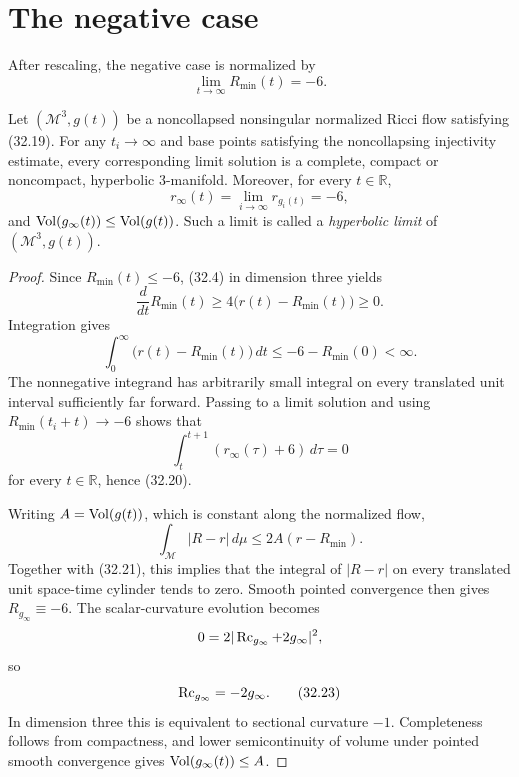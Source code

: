 \section{The negative case}

After rescaling, the negative case is normalized by
\begin{equation*}
 \lim_{t\to\infty}R_{\min}(t)=-6.
 \tag{32.19}
\end{equation*}

\begin{proposition}
\label{prop:chow-iv-negative-case-hyperbolic-limit}
Let $(\mathcal M^3,g(t))$ be a noncollapsed nonsingular normalized Ricci
flow satisfying (32.19).  For any $t_i\to\infty$ and base points satisfying
the noncollapsing injectivity estimate, every corresponding limit solution
is a complete, compact or noncompact, hyperbolic $3$-manifold.  Moreover,
for every $t\in\mathbb R$,
\begin{equation*}
 r_\infty(t)=\lim_{i\to\infty}r_{g_i(t)}=-6,
 \tag{32.20}
\end{equation*}
and $\operatorname{Vol}(g_\infty(t))\le\operatorname{Vol}(g(t))$.  Such a limit is called a
\emph{hyperbolic limit} of $(\mathcal M^3,g(t))$.
\end{proposition}
\begin{proof}
Since $R_{\min}(t)\le-6$, (32.4) in dimension three yields
\[
 \frac d{dt}R_{\min}(t)
 \ge4\bigl(r(t)-R_{\min}(t)\bigr)\ge0.
\]
Integration gives
\begin{equation*}
 \int_0^\infty\bigl(r(t)-R_{\min}(t)\bigr)\,dt
 \le -6-R_{\min}(0)<\infty.
 \tag{32.21}
\end{equation*}
The nonnegative integrand has arbitrarily small integral on every translated
unit interval sufficiently far forward.  Passing to a limit solution and
using $R_{\min}(t_i+t)\to-6$ shows that
\[
 \int_t^{t+1}(r_\infty(\tau)+6)\,d\tau=0
\]
for every $t\in\mathbb R$, hence (32.20).

Writing $A=\operatorname{Vol}(g(t))$, which is constant along the normalized flow,
\[
 \int_{\mathcal M}|R-r|\,d\mu
 \le2A(r-R_{\min}).
\]
Together with (32.21), this implies that the integral of $|R-r|$ on every
translated unit space-time cylinder tends to zero.  Smooth pointed
convergence then gives $R_{g_\infty}\equiv-6$.  The scalar-curvature
evolution becomes
\[
 0=2|\operatorname{Rc}_{g_\infty}+2g_\infty|^2,
\]
so
\begin{equation*}
 \operatorname{Rc}_{g_\infty}=-2g_\infty.
 \tag{32.23}
\end{equation*}
In dimension three this is equivalent to sectional curvature $-1$.
Completeness follows from compactness, and lower semicontinuity of volume
under pointed smooth convergence gives
$\operatorname{Vol}(g_\infty(t))\le A$.
\end{proof}
